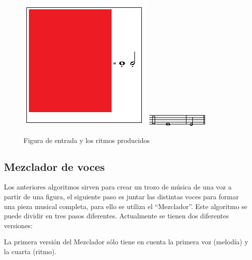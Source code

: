 \begin{itemize}
		\begin{figure}[htbp]
		\centering
		\hspace*{0.0in}
		\includegraphics[scale=1]{graphics/simpletest2-F2F3_3.png}
		\includegraphics[scale=1]{graphics/simpletest2-PERpartitura.png}
		\caption{Figura de entrada y los ritmos producidos}
		\label{fig:Figura4Voz4}
		\end{figure}

\end{itemize}


\subsection{Mezclador de voces}

Los anteriores algoritmos sirven para crear un trozo de música de una voz a partir de una figura, el siguiente paso es juntar las distintas voces para formar una pieza musical completa, para ello se utiliza el ``Mezclador''. 
Este algoritmo se puede dividir en tres pasos diferentes. Actualmente se tienen dos diferentes versiones:

La primera versión del Mezclador sólo tiene en cuenta la primera voz (melodía) y la cuarta (ritmo).

